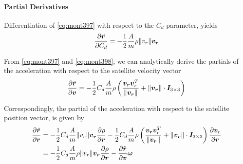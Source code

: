 \paragraph{Partial Derivatives}\label{par:atmospheric-drag-partials}
Differentiation of \autoref{eq:mont397} with respect to the $C_d$ parameter, yields
\begin{equation}
  \frac{\partial \ddot{\bm{r}}}{\partial C_d} = 
    -\frac{1}{2} \frac{A}{m} \rho \lVert v_r\rVert \bm{v_r}
\end{equation}

From \autoref{eq:mont397} and \autoref{eq:mont398}, we can analytically derive the 
partials of the acceleration with respect to the satellite velocity vector
\begin{equation}
  \frac{\partial \ddot{\bm{r}}}{\partial \bm{v}} = 
  -\frac{1}{2} C_d \frac{A}{m} \rho \left( \frac{\bm{v_r}\bm{v}^T_r}{\lVert\bm{v_r}\rVert} 
    + \lVert\bm{v_r}\rVert \cdot \bm{I}_{3\times 3} \right)
\end{equation}

Correspondingly, the partial of the acceleration with respect to the satellite position 
vector, is given by
\begin{equation}
  \label{eq:mont784}
  \begin{aligned}
    \frac{\partial \ddot{\bm{r}}}{\partial \bm{r}} &= 
    -\frac{1}{2} C_d \frac{A}{m} \lVert v_r\rVert \bm{v_r} \frac{\partial \rho}{\partial \bm{r}}
    -\frac{1}{2} C_d \frac{A}{m} \rho \left( \frac{\bm{v_r}\bm{v}^T_r}{\lVert\bm{v_r}\rVert} 
    + \lVert\bm{v_r}\rVert \cdot \bm{I}_{3\times 3} \right) \frac{\partial \bm{v}_r}{\partial \bm{r}} \\
    & = -\frac{1}{2} C_d \frac{A}{m} \rho \lVert v_r\rVert \bm{v_r} \frac{\partial \rho}{\partial \bm{r}}
      -\frac{\partial \ddot{\bm{r}}}{\partial \bm{v}} \bm{\omega} 
  \end{aligned}
\end{equation}

